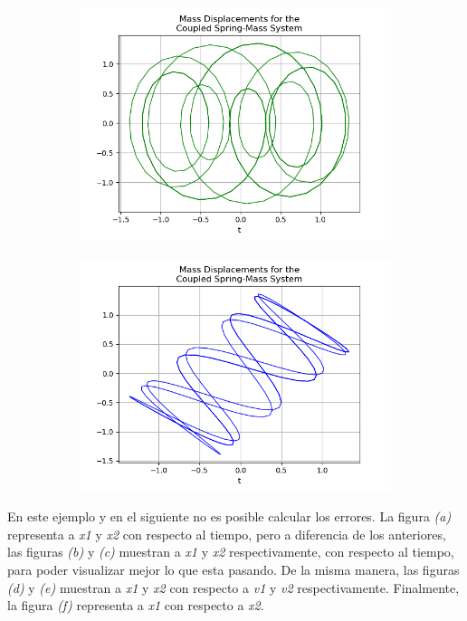 \documentclass{article}
\begin{document}
\begin{figure}[h!]
\begin{subfigure}[b]{0.45\linewidth}
    \includegraphics[width=\linewidth]{two_springs235.png}
    \caption{}
  \end{subfigure}
  \begin{subfigure}[b]{0.5\linewidth}
    \includegraphics[width=\linewidth]{two_springs236.png}
    \caption{}
  \end{subfigure}
\end{figure}

\vspace{0.3cm}

En este ejemplo y en el siguiente no es posible calcular los errores. La figura \textit{(a)} representa a \textit{x1} y \textit{x2} con respecto al tiempo, pero a diferencia de los anteriores, las figuras \textit{(b)} y \textit{(c)} muestran a \textit{x1} y \textit{x2} respectivamente, con respecto al tiempo, para poder visualizar mejor lo que esta pasando. De la misma manera, las figuras \textit{(d)} y \textit{(e)} muestran a \textit{x1} y \textit{x2} con respecto a \textit{v1} y \textit{v2} respectivamente. Finalmente, la figura \textit{(f)} representa a \textit{x1} con respecto a \textit{x2}.
\end{document}
